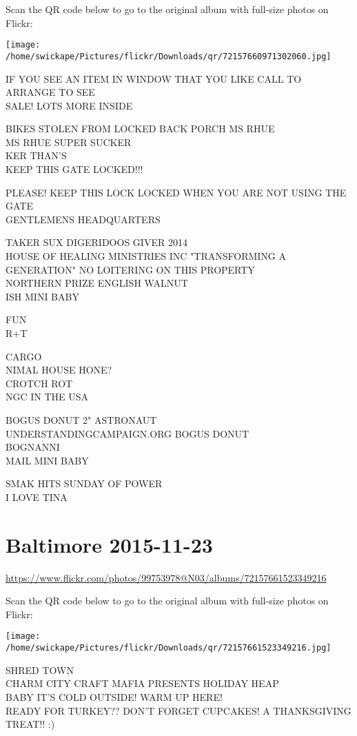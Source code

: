\documentclass[10pt,letterpaper]{article}
\begin{document}
Scan the QR code below to go to the original album with full-size photos on Flickr:

\texttt{[image: /home/swickape/Pictures/flickr/Downloads/qr/72157660971302060.jpg]}
\pagebreak

IF YOU SEE AN ITEM IN WINDOW THAT YOU LIKE CALL TO ARRANGE TO SEE\\
SALE!  LOTS MORE INSIDE

BIKES STOLEN FROM LOCKED BACK PORCH MS RHUE\\
MS RHUE SUPER SUCKER\\
KER THAN'S\\
KEEP THIS GATE LOCKED!!!

PLEASE!  KEEP THIS LOCK LOCKED WHEN YOU ARE NOT USING THE GATE\\
GENTLEMENS HEADQUARTERS

TAKER SUX DIGERIDOOS GIVER 2014\\
HOUSE OF HEALING MINISTRIES INC "TRANSFORMING A GENERATION" NO LOITERING ON THIS PROPERTY\\
NORTHERN PRIZE ENGLISH WALNUT\\
ISH MINI BABY

FUN\\
R+T

CARGO\\
NIMAL HOUSE HONE?\\
CROTCH ROT\\
NGC IN THE USA

BOGUS DONUT 2" ASTRONAUT\\
UNDERSTANDINGCAMPAIGN.ORG BOGUS DONUT\\
BOGNANNI\\
MAIL MINI BABY

SMAK HITS SUNDAY OF POWER\\
I LOVE TINA
\pagebreak

\section*{Baltimore 2015-11-23}

\url{https://www.flickr.com/photos/99753978@N03/albums/72157661523349216}

Scan the QR code below to go to the original album with full-size photos on Flickr:

\texttt{[image: /home/swickape/Pictures/flickr/Downloads/qr/72157661523349216.jpg]}
\pagebreak

SHRED TOWN\\
CHARM CITY CRAFT MAFIA PRESENTS HOLIDAY HEAP\\
BABY IT'S COLD OUTSIDE!  WARM UP HERE!\\
READY FOR TURKEY??  DON'T FORGET CUPCAKES!  A THANKSGIVING TREAT!! :)
\end{document}

